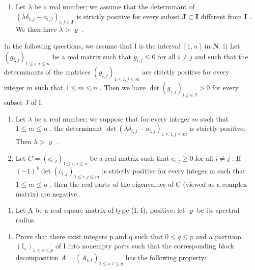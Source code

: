 \begin{enumerate}
\def\labelenumi{\alph{enumi})}
\setcounter{enumi}{7}
\tightlist
\item
  Let \(\lambda\) be a real number; we assume that the determinant of \((\lambda \delta_{i,j} - a_{i,j})_{i,j \in \mathbf{J}}\) is strictly positive for every subset \(\mathbf{J} \subset \mathbf{I}\) different from \(\mathbf{I}\) . We then have \(\lambda > \varrho\) .
\end{enumerate}

In the following questions, we assume that \(\mathrm{I}\) is the interval \([1,n]\) in \(\mathbf{N}\). i) Let \((g_{i,j})_{1\leqslant i,j\leqslant n}\) be a real matrix such that \(g_{i,j}\leqslant0\) for all \(i\neq j\) and such that the determinants of the matrices \((g_{i,j})_{1\leqslant i,j\leqslant m}\) are strictly positive for every integer \(m\) such that \(1\leqslant m\leqslant n\) . Then we have \(\det(g_{i,j})_{i,j\in\mathrm{J}}>0\) for every subset J of I.

\begin{enumerate}
\def\labelenumi{\alph{enumi})}
\setcounter{enumi}{9}
\item
  Let \(\lambda\) be a real number; we suppose that for every integer \(m\) such that \(1 \leqslant m \leqslant n\) , the determinant \(\det(\lambda \delta_{i,j} - a_{i,j})_{1 \leqslant i,j \leqslant m}\) is strictly positive. Then \(\lambda > \varrho\) .
\item
  Let \(C = (c_{i,j})_{1 \leqslant i,j \leqslant n}\) be a real matrix such that \(c_{i,j} \geqslant 0\) for all \(i \neq j\) . If \((-1)^{k} \det(c_{i,j})_{1 \leqslant i,j \leqslant m}\) is strictly positive for every integer m such that \(1 \leqslant m \leqslant n\) , then the real parts of the eigenvalues of C (viewed as a complex matrix) are negative.
\end{enumerate}

\begin{enumerate}
\def\labelenumi{\arabic{enumi})}
\setcounter{enumi}{20}
\tightlist
\item
  Let A be a real square matrix of type (I, I), positive; let \(\varrho\) be its spectral radius.
\end{enumerate}

\begin{enumerate}
\def\labelenumi{\alph{enumi})}
\tightlist
\item
  Prove that there exist integers p and q such that \(0 \leqslant q \leqslant p\) and a partition \((\mathrm{I}_{s})_{1 \leqslant s \leqslant p}\) of I into nonempty parts such that the corresponding block decomposition \(A = (A_{s,t})_{1 \leqslant s, t \leqslant p}\) has the following property:
\end{enumerate}

